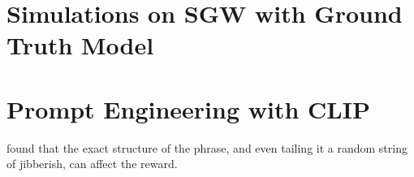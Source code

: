 
\section{Simulations on SGW with Ground Truth Model}

\section{Prompt Engineering with CLIP}
\label{sec:prompt-engineering}
\cite{waffleclip} found that the exact structure of the phrase, and even tailing it a random string of jibberish, can affect the reward. 
